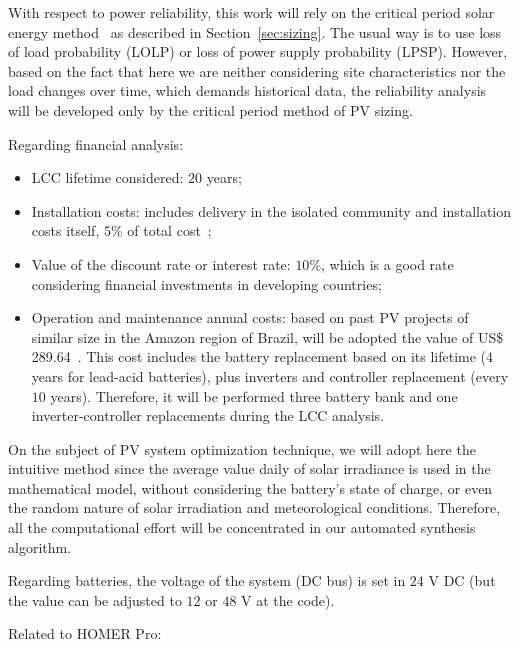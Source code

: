 With respect to power reliability, this work will rely on the critical period solar 
energy method~\cite{Pinho} as described in Section~\ref{sec:sizing}. 
The usual way is to use loss of load probability (LOLP) or loss of power 
supply probability (LPSP). However, based on the fact that here we 
are neither considering site characteristics nor the load changes over time, 
which demands historical data, the reliability analysis will be developed only 
by the critical period method of PV sizing.

Regarding financial analysis:
\begin{itemize}
	\item LCC lifetime considered: $20$ years;
	\item Installation costs: includes delivery in the isolated community and installation costs itself, $5$\% of total cost~\cite{Agrener2013};
	\item Value of the discount rate or interest rate: $10$\%, which is a good rate considering financial investments in developing countries;
	\item Operation and maintenance annual costs: based on past PV projects of similar size in the Amazon region of Brazil, will be adopted the value of US\$ 289.64~\cite{Agrener2013}. This cost includes the battery replacement based on its lifetime ($4$ years for lead-acid batteries), plus inverters and controller replacement (every $10$ years). Therefore, it will be performed three battery bank and one inverter-controller replacements during the LCC analysis.
\end{itemize}

On the subject of PV system optimization technique, we will adopt here the intuitive method 
since the average value daily of solar irradiance is used in the mathematical model, 
without considering the battery's state of charge, or even the random nature 
of solar irradiation and meteorological conditions. Therefore, all the computational 
effort will be concentrated in our automated synthesis algorithm.

Regarding batteries, the voltage of the system (DC bus) is set in $24$ V DC (but the value can be adjusted to $12$ or $48$ V at the code).

Related to HOMER Pro:


